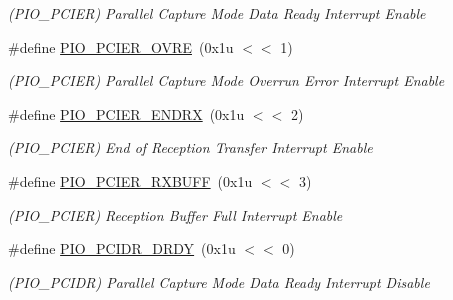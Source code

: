 \begin{DoxyCompactItemize}
\begin{DoxyCompactList}\small\item\em (P\+I\+O\+\_\+\+P\+C\+I\+ER) Parallel Capture Mode Data Ready Interrupt Enable \end{DoxyCompactList}\item 
\mbox{\label{group__SAMS70__PIO_ga88dbc7c44b5f60a8e4e29d073e6387b3}} 
\#define \mbox{\hyperlink{group__SAMS70__PIO_ga88dbc7c44b5f60a8e4e29d073e6387b3}{P\+I\+O\+\_\+\+P\+C\+I\+E\+R\+\_\+\+O\+V\+RE}}~(0x1u $<$$<$ 1)
\begin{DoxyCompactList}\small\item\em (P\+I\+O\+\_\+\+P\+C\+I\+ER) Parallel Capture Mode Overrun Error Interrupt Enable \end{DoxyCompactList}\item 
\mbox{\label{group__SAMS70__PIO_gac5e48cdb99a7acdd4e0fc3f526e674b7}} 
\#define \mbox{\hyperlink{group__SAMS70__PIO_gac5e48cdb99a7acdd4e0fc3f526e674b7}{P\+I\+O\+\_\+\+P\+C\+I\+E\+R\+\_\+\+E\+N\+D\+RX}}~(0x1u $<$$<$ 2)
\begin{DoxyCompactList}\small\item\em (P\+I\+O\+\_\+\+P\+C\+I\+ER) End of Reception Transfer Interrupt Enable \end{DoxyCompactList}\item 
\mbox{\label{group__SAMS70__PIO_gadbc31fdf1013c23b291e09419f7c195c}} 
\#define \mbox{\hyperlink{group__SAMS70__PIO_gadbc31fdf1013c23b291e09419f7c195c}{P\+I\+O\+\_\+\+P\+C\+I\+E\+R\+\_\+\+R\+X\+B\+U\+FF}}~(0x1u $<$$<$ 3)
\begin{DoxyCompactList}\small\item\em (P\+I\+O\+\_\+\+P\+C\+I\+ER) Reception Buffer Full Interrupt Enable \end{DoxyCompactList}\item 
\mbox{\label{group__SAMS70__PIO_ga587bc2e85bf34789a484507581645e37}} 
\#define \mbox{\hyperlink{group__SAMS70__PIO_ga587bc2e85bf34789a484507581645e37}{P\+I\+O\+\_\+\+P\+C\+I\+D\+R\+\_\+\+D\+R\+DY}}~(0x1u $<$$<$ 0)
\begin{DoxyCompactList}\small\item\em (P\+I\+O\+\_\+\+P\+C\+I\+DR) Parallel Capture Mode Data Ready Interrupt Disable \end{DoxyCompactList}\item 

\end{DoxyCompactItemize}
